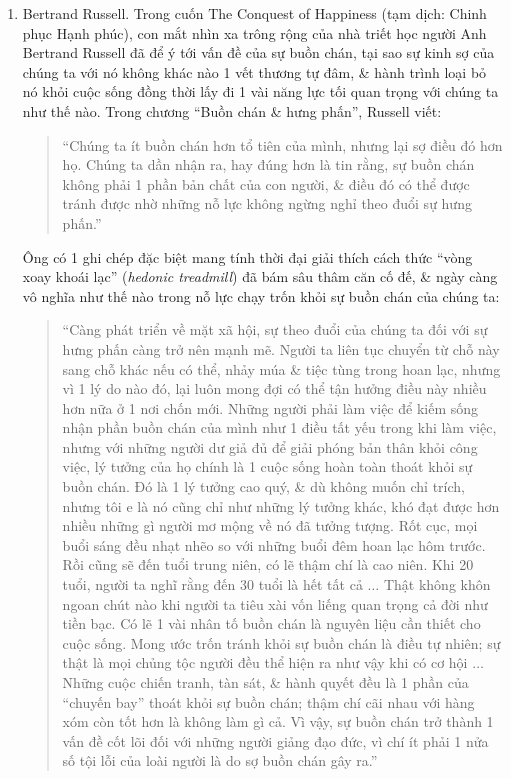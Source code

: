 \documentclass{article}
\begin{document}
\begin{enumerate}
	\item {\sc Bertrand Russell.} Trong cuốn The Conquest of Happiness (tạm dịch: Chinh phục Hạnh phúc), con mắt nhìn xa trông rộng của nhà triết học người Anh {\sc Bertrand Russell} đã để ý tới vấn đề của sự buồn chán, tại sao sự kinh sợ của chúng ta với nó không khác nào 1 vết thương tự đâm, \& hành trình loại bỏ nó khỏi cuộc sống đồng thời lấy đi 1 vài năng lực tối quan trọng với chúng ta như thế nào. Trong chương ``Buồn chán \& hưng phấn'', {\sc Russell} viết:
	\begin{quote}
		``Chúng ta ít buồn chán hơn tổ tiên của mình, nhưng lại sợ điều đó hơn họ. Chúng ta dần nhận ra, hay đúng hơn là tin rằng, sự buồn chán không phải 1 phần bản chất của con người, \& điều đó có thể được tránh được nhờ những nỗ lực không ngừng nghỉ theo đuổi sự hưng phấn.''
	\end{quote}
	Ông có 1 ghi chép đặc biệt mang tính thời đại giải thích cách thức ``vòng xoay khoái lạc'' ({\it hedonic treadmill}) đã bám sâu thâm căn cố đế, \& ngày càng vô nghĩa như thế nào trong nỗ lực chạy trốn khỏi sự buồn chán của chúng ta:
	\begin{quote}
		``Càng phát triển về mặt xã hội, sự theo đuổi của chúng ta đối với sự hưng phấn càng trở nên mạnh mẽ. Người ta liên tục chuyển từ chỗ này sang chỗ khác nếu có thể, nhảy múa \& tiệc tùng trong hoan lạc, nhưng vì 1 lý do nào đó, lại luôn mong đợi có thể tận hưởng điều này nhiều hơn nữa ở 1 nơi chốn mới. Những người phải làm việc để kiếm sống nhận phần buồn chán của mình như 1 điều tất yếu trong khi làm việc, nhưng với những người dư giả đủ để giải phóng bản thân khỏi công việc, lý tưởng của họ chính là 1 cuộc sống hoàn toàn thoát khỏi sự buồn chán. Đó là 1 lý tưởng cao quý, \& dù không muốn chỉ trích, nhưng tôi e là nó cũng chỉ như những lý tưởng khác, khó đạt được hơn nhiều những gì người mơ mộng về nó đã tưởng tượng. Rốt cục, mọi buổi sáng đều nhạt nhẽo so với những buổi đêm hoan lạc hôm trước. Rồi cũng sẽ đến tuổi trung niên, có lẽ thậm chí là cao niên. Khi 20 tuổi, người ta nghĩ rằng đến 30 tuổi là hết tất cả $\ldots$ Thật không khôn ngoan chút nào khi người ta tiêu xài vốn liếng quan trọng cả đời như tiền bạc. Có lẽ 1 vài nhân tố buồn chán là nguyên liệu cần thiết cho cuộc sống. Mong ước trốn tránh khỏi sự buồn chán là điều tự nhiên; sự thật là mọi chủng tộc người đều thể hiện ra như vậy khi có cơ hội $\ldots$ Những cuộc chiến tranh, tàn sát, \& hành quyết đều là 1 phần của ``chuyến bay'' thoát khỏi sự buồn chán; thậm chí cãi nhau với hàng xóm còn tốt hơn là không làm gì cả. Vì vậy, sự buồn chán trở thành 1 vấn đề cốt lõi đối với những người giảng đạo đức, vì chí ít phải 1 nửa số tội lỗi của loài người là do sợ buồn chán gây ra.''

\end{quote}
\end{enumerate}
\end{document}
